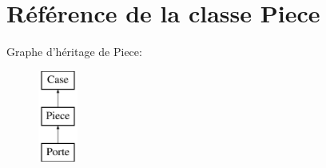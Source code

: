 \hypertarget{classPiece}{\section{\-Référence de la classe \-Piece}
\label{classPiece}
}
\-Graphe d'héritage de \-Piece\-:\begin{figure}[H]
\begin{center}
\leavevmode
\includegraphics[height=3.000000cm]{classPiece}
\end{center}
\end{figure}
